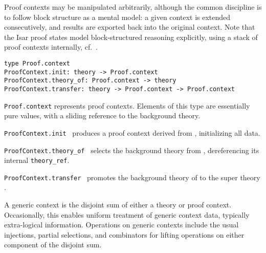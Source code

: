 \begin{isabellebody}
\begin{isamarkuptext}
  Proof contexts may be manipulated arbitrarily, although the common
  discipline is to follow block structure as a mental model: a given
  context is extended consecutively, and results are exported back
  into the original context.  Note that the Isar proof states model
  block-structured reasoning explicitly, using a stack of proof
  contexts internally, cf.\ .%
\end{isamarkuptext}%
\isamarkuptrue%
%
\isadelimmlref
%
\endisadelimmlref
%
\isatagmlref
%
\begin{isamarkuptext}%
\begin{mldecls}
  \verb|type Proof.context| \\
  \verb|ProofContext.init: theory -> Proof.context| \\
  \verb|ProofContext.theory_of: Proof.context -> theory| \\
  \verb|ProofContext.transfer: theory -> Proof.context -> Proof.context| \\
  \end{mldecls}

  \begin{description}

  \item \verb|Proof.context| represents proof contexts.  Elements
  of this type are essentially pure values, with a sliding reference
  to the background theory.

  \item \verb|ProofContext.init|~ produces a proof context
  derived from , initializing all data.

  \item \verb|ProofContext.theory_of|~ selects the
  background theory from , dereferencing its internal
  \verb|theory_ref|.

  \item \verb|ProofContext.transfer|~ promotes the
  background theory of  to the super theory .

  \end{description}%
\end{isamarkuptext}%
\isamarkuptrue%
%
\endisatagmlref
{\isafoldmlref}%
%
\isadelimmlref
%
\endisadelimmlref
%
\isamarkuptrue%
%
\begin{isamarkuptext}%
A generic context is the disjoint sum of either a theory or proof
  context.  Occasionally, this enables uniform treatment of generic
  context data, typically extra-logical information.  Operations on
  generic contexts include the usual injections, partial selections,
  and combinators for lifting operations on either component of the
  disjoint sum.


\end{isamarkuptext}
\end{isabellebody}
